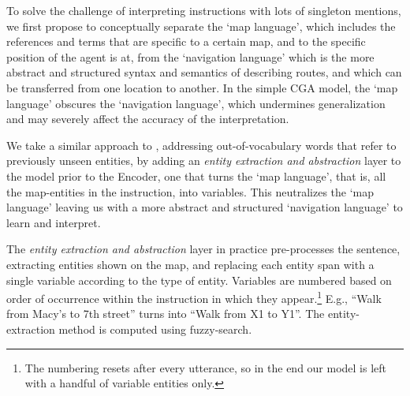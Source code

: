 \documentclass[11pt,a4paper]{article}
\begin{document}
To solve the challenge of interpreting  instructions with lots of singleton mentions, we first propose to conceptually separate the  \enquote*{map language}, which includes the references and terms that are specific to a certain map, and to the specific position of the agent is at,
from the \enquote*{navigation language} %
which is the more abstract and  structured syntax and semantics of describing routes, and which can be transferred from one location to another. In the simple CGA model,  the \enquote*{map language} obscures the \enquote*{navigation language}, which undermines generalization and may severely affect the accuracy of the interpretation. 

We take a similar approach to \citet{iyer2017learning,suhr2018learning},  addressing out-of-vocabulary words that refer to previously unseen entities, by adding an {\em entity extraction and abstraction} layer to the model prior to the Encoder, one that turns the \enquote*{map language}, that is, all the map-entities in the instruction, into variables. This neutralizes the \enquote*{map language} leaving us with a more abstract and structured  \enquote*{navigation language} to learn and interpret.


The {\em entity extraction and abstraction} layer in practice pre-processes the sentence, extracting entities shown on the map, and replacing each entity span with a single variable according to the type of entity. Variables are numbered based on order of occurrence within the instruction in which they appear.\footnote{The numbering resets after every utterance, so in the end our model is left with a handful of variable entities only.}  E.g., \enquote{Walk from Macy's to 7th street} turns into \enquote{Walk from X1 to Y1}. The entity-extraction method is computed using fuzzy-search.



 \begin{figure*}[ht]

  \center
{}
         
        \caption
        {An example of a {\em world-state representation} during navigation. The agent is denoted by a \enquote*{star} symbol. The first part of the world-state is the current state (\enquote*{current BOW position}) and the second is the direction ahead (\enquote*{forward BOW position}). When the agent is in \enquote*{Cherry Tavern} (swapped for \enquote*{X1}) the current position representation indicates it by a \enquote*{1} in the first bit. When the agent reaches her final destination - \enquote*{Mother of Pearl} (swapped for \enquote*{X2}), it is represented in the current position representation by a \enquote*{1} in the second bit.} 
        \label{fig:world_state}
    \end{figure*}
    
\end{document}

